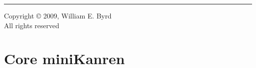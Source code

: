 \documentclass[onecolumn, 11pt, oneside, openright]{book}
\newcommand{\thesisauthor}[0]{William E. Byrd}
\newcommand{\thesisyear}[0]{2009}
\begin{document}
{
  \fontsize{12}{12}
  \mbox{}
  \vfill

  \hrule

  \begin{center}
    Copyright \copyright{} \thesisyear{}, \thesisauthor{}\\ 
    All rights reserved
    \end{center}
}







{
\setcounter{tocdepth}{1}
\setlength{\parskip}{0pt}
\tableofcontents
}

\newpage

\mainmatter



\part{Core miniKanren}\label{coremkpart}

\end{document}

